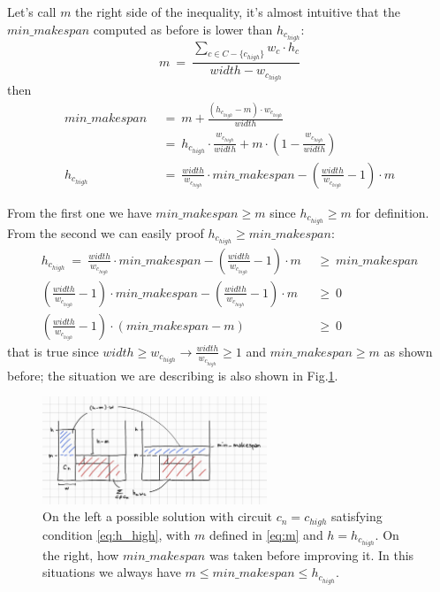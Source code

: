         Let's call $m$ the right side of the inequality, it's almost intuitive that the $min\_makespan$ computed
        as before is lower than $h_{c_{high}}$:
        \begin{equation}
            m\ =\ \frac{\sum_{c \in C - \{c_{high}\}} w_c \cdot h_c}{width - w_{c_{high}}}
            \label{eq:m}
        \end{equation}
        then
        \begin{align*}
            min\_makespan\  &\ =\ m + \frac{(h_{c_{high}} - m) \cdot w_{c_{high}}}{width}                                               \\
                            &\ =\ h_{c_{high}} \cdot \frac{w_{c_{high}}}{width} + m \cdot \left(1 - \frac{w_{c_{high}}}{width}\right)   \\
            h_{c_{high}}\   &\ =\ \frac{width}{w_{c_{high}}} \cdot min\_makespan - \left( \frac{width}{w_{c_{high}}} - 1\right) \cdot m
        \end{align*}

        From the first one we have $min\_makespan \geq m$ since $h_{c_{high}} \geq m$ for definition.
        From the second we can easily proof $h_{c_{high}} \geq min\_makespan$:
        \begin{align*}
            h_{c_{high}}\ =\ \frac{width}{w_{c_{high}}} \cdot min\_makespan - \left( \frac{width}{w_{c_{high}}} - 1\right) \cdot m\ &\ \geq\ min\_makespan       \\
            \left( \frac{width}{w_{c_{high}}} - 1\right) \cdot min\_makespan - \left( \frac{width}{w_{c_{high}}} - 1\right) \cdot m\ &\ \geq\ 0 \\
            \left( \frac{width}{w_{c_{high}}} - 1\right) \cdot \left(min\_makespan - m\right) \ &\ \geq\ 0
        \end{align*}
        that is true since $width \geq w_{c_{high}} \rightarrow \frac{width}{w_{c_{high}}} \geq 1$ and $min\_makespan \geq m$ as shown before;
        the situation we are describing is also shown in Fig.\ref{fig:min_makespan}. 

        \begin{figure}[H]
            \centering
            \includegraphics[width=0.6\textwidth]{min_makespan_exc.jpg}
            \caption{
                On the left a possible solution with circuit $c_n=c_{high}$ satisfying condition \ref{eq:h_high}, 
                with $m$ defined in \ref{eq:m} and $h = h_{c_{high}}$. On the right, how $min\_makespan$ was taken before
                improving it. In this situations we always have $m \leq min\_makespan \leq h_{c_{high}}$.
            }
            \label{fig:min_makespan}
        \end{figure}
        
